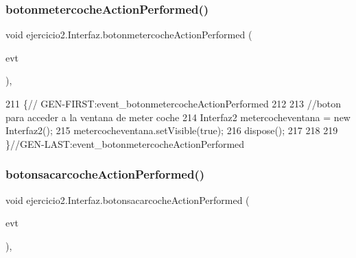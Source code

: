 \subsubsection{\texorpdfstring{botonmetercoche\+Action\+Performed()}{botonmetercocheActionPerformed()}}
{\footnotesize\ttfamily void ejercicio2.\+Interfaz.\+botonmetercoche\+Action\+Performed (\begin{DoxyParamCaption}\item[{java.\+awt.\+event.\+Action\+Event}]{evt }\end{DoxyParamCaption})\hspace{0.3cm}{\ttfamily [inline]}, {\ttfamily [private]}}


\begin{DoxyCode}
211                                                                                 \{\textcolor{comment}{//
      GEN-FIRST:event\_botonmetercocheActionPerformed}
212         
213         \textcolor{comment}{//boton para acceder a la ventana de meter coche}
214         Interfaz2 metercocheventana = \textcolor{keyword}{new} Interfaz2();
215         metercocheventana.setVisible(\textcolor{keyword}{true});
216         dispose();
217                 
218         
219     \}\textcolor{comment}{//GEN-LAST:event\_botonmetercocheActionPerformed}
\end{DoxyCode}
\mbox{\label{classejercicio2_1_1_interfaz_ade1ca9ed4198f4774821ffa554a3be9c}} 
\subsubsection{\texorpdfstring{botonsacarcoche\+Action\+Performed()}{botonsacarcocheActionPerformed()}}
{\footnotesize\ttfamily void ejercicio2.\+Interfaz.\+botonsacarcoche\+Action\+Performed (\begin{DoxyParamCaption}\item[{java.\+awt.\+event.\+Action\+Event}]{evt }\end{DoxyParamCaption})\hspace{0.3cm}{\ttfamily [inline]}, {\ttfamily [private]}}


